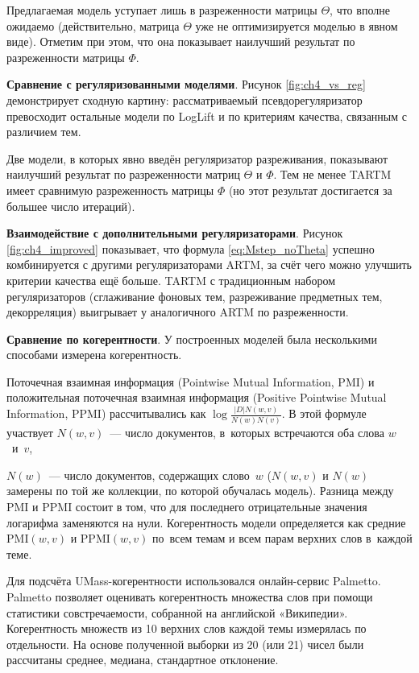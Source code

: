 Предлагаемая модель уступает лишь в разреженности матрицы $\Theta$, что вполне ожидаемо (действительно, матрица $\Theta$ уже не оптимизируется моделью в явном виде). Отметим при этом, что она показывает наилучший результат по разреженности матрицы $\Phi$.  

\textbf{Сравнение с регуляризованными моделями}. Рисунок \ref{fig:ch4_vs_reg} демонстрирует сходную картину: рассматриваемый псевдорегуляризатор превосходит остальные модели по LogLift и по критериям качества, связанным с различием тем.  

Две модели, в которых явно введён регуляризатор разреживания, показывают наилучший результат по разреженности матриц $\Theta$ и $\Phi$. Тем не менее TARTM имеет сравнимую разреженность матрицы $\Phi$ (но этот результат достигается за большее число итераций).  

\textbf{Взаимодействие с дополнительными регуляризаторами}. Рисунок \ref{fig:ch4_improved} показывает, что формула \ref{eq:Mstep_noTheta} успешно комбинируется с другими регуляризаторами ARTM, за счёт чего можно улучшить критерии качества ещё больше. TARTM с традиционным набором регуляризаторов (сглаживание фоновых тем, разреживание предметных тем, декорреляция) выигрывает у аналогичного ARTM по разреженности.  




\textbf{Сравнение по когерентности}. У построенных моделей была несколькими способами измерена когерентность.  

Поточечная взаимная информация (Pointwise Mutual Information, PMI) и положительная поточечная взаимная информация (Positive Pointwise Mutual Information, PPMI) рассчитывались как $\log\frac{|D| N(w,v)}{N(w)N(v)}$. В этой формуле участвует $N(w,v)$~--- число документов, в~которых встречаются оба слова $w$~и~$v$, 

$N(w)$~--- число документов, содержащих слово~$w$ ($N(w,v)$ и $N(w)$ замерены по той же коллекции, по которой обучалась модель). Разница между PMI и PPMI состоит в том, что для последнего отрицательные значения логарифма заменяются на нули. Когерентность модели определяется как средние $\mathrm{PMI}(w,v)$ и $\mathrm{PPMI}(w,v)$ по~всем темам и всем парам верхних слов в~каждой теме.  

Для подсчёта UMass-когерентности использовался онлайн-сервис Palmetto. Palmetto позволяет оценивать когерентность множества слов при помощи статистики совстречаемости, собранной на английской «Википедии». Когерентность множеств из 10 верхних слов каждой темы измерялась по отдельности. На основе полученной выборки из 20 (или 21) чисел были рассчитаны среднее, медиана, стандартное отклонение.  

